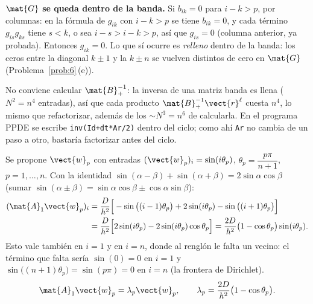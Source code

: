\begin{porque}
\textbf{$\mat{G}$ se queda dentro de la banda.} Si $b_{ik} = 0$ para $i - k > p$, por columnas: en la fórmula de
$g_{ik}$ con $i - k > p$ se tiene $b_{ik} = 0$, y cada término $g_{is}g_{ks}$ tiene $s < k$, o sea
$i - s > i - k > p$, así que $g_{is} = 0$ (columna anterior, ya probada). Entonces $g_{ik} = 0$. Lo que sí
ocurre es \emph{relleno} dentro de la banda: los ceros entre la diagonal $k\pm1$ y la $k\pm n$ se vuelven
distintos de cero en $\mat{G}$ (Problema~\ref{prob:6}\,(e)).
\end{porque}

\begin{ojo}
No conviene calcular $\mat{B}_+^{-1}$: la inversa de una matriz banda es llena ($N^2 = n^4$ entradas), así que
cada producto $\mat{B}_+^{-1}\vect{r}^\ell$ cuesta $n^4$, lo mismo que refactorizar, además de los $\sim N^3 = n^6$
de calcularla. En el programa PPDE se escribe \texttt{inv(Id+dt*Ar/2)} dentro del ciclo; como ahí
\texttt{Ar} no cambia de un paso a otro, bastaría factorizar antes del ciclo.
\end{ojo}


Se propone $\vect{w}_p$ con entradas $(\vect{w}_p)_i = \sin(i\theta_p)$, $\theta_p = \dfrac{p\pi}{n+1}$,
$p = 1, \dots, n$. Con la identidad $\sin(\alpha - \beta) + \sin(\alpha + \beta) = 2\sin\alpha\cos\beta$
(sumar $\sin(\alpha\pm\beta) = \sin\alpha\cos\beta \pm \cos\alpha\sin\beta$):
\begin{align*}
  (\mat{A}_1\vect{w}_p)_i
  &= \frac{D}{h^2}\Big[-\sin\big((i-1)\theta_p\big) + 2\sin(i\theta_p) - \sin\big((i+1)\theta_p\big)\Big]\\
  &= \frac{D}{h^2}\Big[2\sin(i\theta_p) - 2\sin(i\theta_p)\cos\theta_p\Big]
   = \frac{2D}{h^2}\big(1 - \cos\theta_p\big)\sin(i\theta_p).
\end{align*}
Esto vale también en $i = 1$ y en $i = n$, donde al renglón le falta un vecino: el término que falta sería
$\sin(0) = 0$ en $i = 1$ y $\sin\big((n+1)\theta_p\big) = \sin(p\pi) = 0$ en $i = n$ (la frontera de Dirichlet).
\[
  \mat{A}_1\vect{w}_p = \lambda_p\vect{w}_p, \qquad \lambda_p = \frac{2D}{h^2}\big(1 - \cos\theta_p\big).
\]

